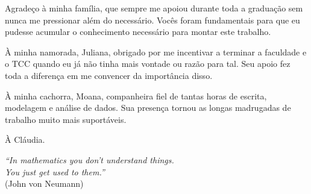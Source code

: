\documentclass[
	12pt,				%
	oneside,			%
	a4paper,			%
	english,			%
	french,				%
	spanish,			%
	brazil				%
	]{abntex2}
\begin{document}
\begin{agradecimentos}

Agradeço à minha família, que sempre me apoiou durante toda a graduação sem nunca me pressionar além do necessário. Vocês foram fundamentais para que eu pudesse acumular o conhecimento necessário para montar este trabalho.

À minha namorada, Juliana, obrigado por me incentivar a terminar a faculdade e o TCC quando eu já não tinha mais vontade ou razão para tal. Seu apoio fez toda a diferença em me convencer da importância disso.

À minha cachorra, Moana, companheira fiel de tantas horas de escrita, modelagem e análise de dados. Sua presença tornou as longas madrugadas de trabalho muito mais suportáveis.

À Cláudia.

\end{agradecimentos}

\begin{epigrafe}
    \vspace*{\fill}
	\begin{flushright}
		\textit{``In mathematics you don't understand things.\\
		You just get used to them.''}\\
		(John von Neumann)
	\end{flushright}
\end{epigrafe}

\end{document}
